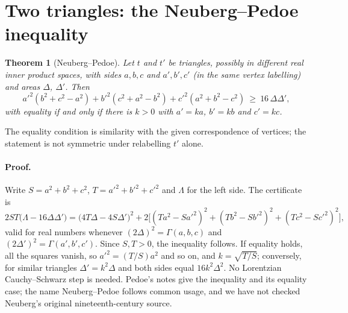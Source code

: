 \documentclass[11pt]{article}
\newtheorem{theorem}{Theorem}
\theoremstyle{definition}
\theoremstyle{remark}
\begin{document}
\section{Two triangles: the Neuberg--Pedoe inequality}\label{sec:pedoe}
\begin{theorem}[Neuberg--Pedoe]\label{thm:pedoe}
Let $t$ and $t'$ be triangles, possibly in different real inner product spaces, with sides
$a,b,c$ and $a',b',c'$ (in the same vertex labelling) and areas $\Delta$, $\Delta'$. Then
\[
a'^2(b^2+c^2-a^2)+b'^2(c^2+a^2-b^2)+c'^2(a^2+b^2-c^2)\ \ge\ 16\,\Delta\Delta',
\]
with equality if and only if there is $k>0$ with $a'=ka$, $b'=kb$ and $c'=kc$.
\end{theorem}
The equality condition is similarity with the given correspondence of vertices; the statement is
not symmetric under relabelling $t'$ alone.

\paragraph{Proof.} Write $S=a^2+b^2+c^2$, $T=a'^2+b'^2+c'^2$ and $\Lambda$ for the left side. The
certificate  is
\[
2ST\bigl(\Lambda-16\Delta\Delta'\bigr)=\bigl(4T\Delta-4S\Delta'\bigr)^2
+2\bigl[(Ta^2-Sa'^2)^2+(Tb^2-Sb'^2)^2+(Tc^2-Sc'^2)^2\bigr],
\]
valid for real numbers whenever $(2\Delta)^2=\Gamma(a,b,c)$ and $(2\Delta')^2=\Gamma(a',b',c')$.
Since $S,T>0$, the inequality follows. If equality holds, all the squares vanish, so
$a'^2=(T/S)a^2$ and so on, and $k=\sqrt{T/S}$; conversely, for similar triangles $\Delta'=k^2\Delta$ and
both sides equal $16k^2\Delta^2$. No Lorentzian Cauchy--Schwarz step is needed. Pedoe's notes
\cite{pedoe1941,pedoe1942} give the inequality and its equality case; the name Neuberg--Pedoe follows
common usage, and we have not checked Neuberg's original nineteenth-century source.
\end{document}
